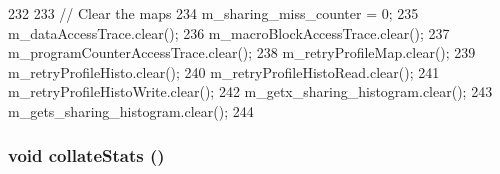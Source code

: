 \begin{DoxyCode}
232 {
233     // Clear the maps
234     m_sharing_miss_counter = 0;
235     m_dataAccessTrace.clear();
236     m_macroBlockAccessTrace.clear();
237     m_programCounterAccessTrace.clear();
238     m_retryProfileMap.clear();
239     m_retryProfileHisto.clear();
240     m_retryProfileHistoRead.clear();
241     m_retryProfileHistoWrite.clear();
242     m_getx_sharing_histogram.clear();
243     m_gets_sharing_histogram.clear();
244 }
\end{DoxyCode}
\hypertarget{classAddressProfiler_a208669cbc0bb1d52565956ca8c690c55}{
\subsubsection[{collateStats}]{\setlength{\rightskip}{0pt plus 5cm}void collateStats ()}}
\label{classAddressProfiler_a208669cbc0bb1d52565956ca8c690c55}



